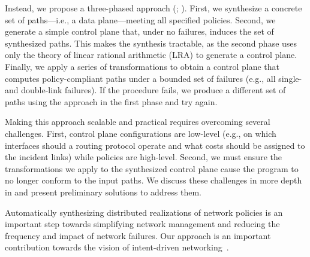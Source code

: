 
Instead, we propose 
a three-phased approach (; ). First, we
synthesize a concrete set of paths---i.e., a data plane---meeting 
all specified policies.
Second, we generate a simple control plane that,
under no failures,
induces the set of synthesized paths. This makes the synthesis 
tractable, as the second phase uses only the theory of linear 
rational arithmetic (LRA) to generate a control plane. 
Finally, we 
apply a series of
transformations
to obtain a control plane that  computes policy-compliant paths under a bounded set of failures (e.g.,
all single- and double-link failures).
If the procedure fails, we produce a different set of paths using the approach in the first phase 
and try again. 


Making this approach scalable and practical requires overcoming several
challenges. First, control plane configurations are low-level (e.g., on which
interfaces should a routing protocol operate and what costs should be assigned
to the incident links) while policies are high-level. Second, we must ensure
the transformations we apply to the synthesized control plane cause the
program to no longer conform to the input paths. We discuss these challenges
in more depth in  and present preliminary solutions to
address them.

Automatically synthesizing distributed realizations of network policies is an
important step towards simplifying network management and reducing the
frequency and impact of network failures. Our approach is an important
contribution towards the vision of intent-driven networking~\cite{intent}.


